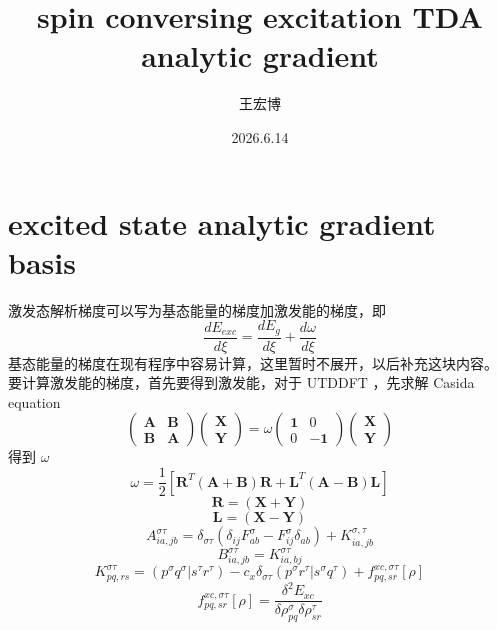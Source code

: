 \documentclass[11pt]{ctexart}
\title{spin conversing excitation TDA analytic gradient}
\author{王宏博}
\date{2026.6.14}
\numberwithin{equation}{section}
\begin{document}
\maketitle
\vspace{-2.2em}
\section{excited state analytic gradient basis}
激发态解析梯度可以写为基态能量的梯度加激发能的梯度，即
\begin{equation}
    \frac{d E_{exc}}{d\xi} = \frac{d E_{g}}{d \xi} + \frac{d \omega}{d \xi}
\end{equation}
基态能量的梯度在现有程序中容易计算，这里暂时不展开，以后补充这块内容。
要计算激发能的梯度，首先要得到激发能，对于 UTDDFT ，先求解 Casida equation
\begin{equation}
    \begin{pmatrix}
        \mathbf{A} & \mathbf{B}\\
        \mathbf{B} & \mathbf{A}
    \end{pmatrix}
    \begin{pmatrix}
        \mathbf{X}\\
        \mathbf{Y}
    \end{pmatrix}
    = \omega
    \begin{pmatrix}
        \mathbf{1} & 0\\
        0 & \mathbf{-1}
    \end{pmatrix}
    \begin{pmatrix}
        \mathbf{X}\\
        \mathbf{Y}
    \end{pmatrix}
\end{equation}
得到 $\omega$
\begin{equation}
    \omega = \frac{1}{2}[
        \mathbf{R}^T(\mathbf{A}+\mathbf{B})\mathbf{R} 
        + \mathbf{L}^T(\mathbf{A}-\mathbf{B})\mathbf{L}
    ]
\end{equation}
\begin{equation}
    \mathbf{R} = (\mathbf{X} + \mathbf{Y})
\end{equation}
\begin{equation}
    \mathbf{L} = (\mathbf{X} - \mathbf{Y})
\end{equation}
\begin{equation}
    A_{ia,jb}^{\sigma\tau} 
    = \delta_{\sigma\tau}(\delta_{ij}F_{ab}^{\sigma} - F_{ij}^{\sigma}\delta_{ab})
    + K_{ia,jb}^{\sigma,\tau}
\end{equation}
\begin{equation}
    B_{ia, jb}^{\sigma\tau} 
    = K_{ia,bj}^{\sigma\tau}
\end{equation}
\begin{equation}
    K_{pq,rs}^{\sigma\tau} 
    = (p^{\sigma}q^{\sigma}|s^{\tau}r^{\tau}) 
    - c_x\delta_{\sigma\tau}(p^{\sigma}r^{\tau}|s^{\sigma}q^{\tau})
    + f_{pq,sr}^{xc,\sigma\tau}[\rho] 
\end{equation}
\begin{equation}
    f_{pq,sr}^{xc,\sigma\tau}[\rho] 
    = \frac{\delta^2 E_{xc}}{\delta\rho_{pq}^{\sigma} \delta\rho_{sr}^{\tau}}
\end{equation}
\end{document}
